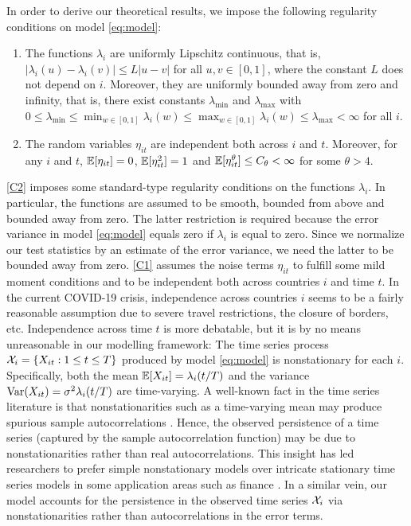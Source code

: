 \documentclass[a4paper,12pt]{article}
\numberwithin{equation}{section}
\begin{document}
In order to derive our theoretical results, we impose the following regularity conditions on model \eqref{eq:model}:
\begin{enumerate}[label=(C\arabic*),leftmargin=1.0cm]
\item \label{C2} The functions $\lambda_i$ are uniformly Lipschitz continuous, that is, $|\lambda_i(u) - \lambda_i(v)| \le L |u-v|$ for all $u, v \in [0,1]$, where the constant $L$ does not depend on $i$. Moreover, they are uniformly bounded away from zero and infinity, that is, there exist constants $\lambda_{\min}$ and $\lambda_{\max}$ with $0 \le \lambda_{\min} \le \min_{w \in [0,1]} \lambda_i(w) \le \max_{w \in [0,1]} \lambda_i(w) \le \lambda_{\max} < \infty$ for all $i$. 
\item \label{C1} The random variables $\eta_{it}$ are independent both across $i$ and $t$. Moreover, for any $i$ and $t$, $\mathbb{E}[\eta_{it}] = 0$, $\mathbb{E}[\eta_{it}^2] = 1$ and $\mathbb{E}[\eta_{it}^\theta] \le C_\theta < \infty$ for some $\theta > 4$. 
\end{enumerate}
\ref{C2} imposes some standard-type regularity conditions on the functions $\lambda_i$. In particular, the functions are assumed to be smooth, bounded from above and bounded away from zero. The latter restriction is required because the error variance in model \eqref{eq:model} equals zero if $\lambda_i$ is equal to zero. Since we normalize our test statistics by an estimate of the error variance, we need the latter to be bounded away from zero. 
\ref{C1} assumes the noise terms $\eta_{it}$ to fulfill some mild moment conditions and to be independent both across countries $i$ and time $t$. In the current COVID-19 crisis, independence across countries $i$ seems to be a fairly reasonable assumption due to severe travel restrictions, the closure of borders, etc. Independence across time $t$ is more debatable, but it is by no means unreasonable in our modelling framework: The time series process $\mathcal{X}_i = \{X_{it}: 1 \le t \le T\}$ produced by model \eqref{eq:model} is nonstationary for each $i$. Specifically, both the mean $\mathbb{E}[X_{it}] = \lambda_i(t/T)$ and the variance $\textnormal{Var}(X_{it}) = \sigma^2 \lambda_i(t/T)$ are time-varying. A well-known fact in the time series literature is that nonstationarities such as a time-varying mean may produce spurious sample autocorrelations \citep[cp.\ for example][]{MikoschStarica2004, Fryzlewicz2008}. Hence, the observed persistence of a time series (captured by the sample autocorrelation function) may be due to nonstationarities rather than real autocorrelations. This insight has led researchers to prefer simple nonstationary models over intricate stationary time series models in some application areas such as finance \citep[cp.][]{MikoschStarica2000, MikoschStarica2004, Fryzlewicz2006}. In a similar vein, our model accounts for the persistence in the observed time series $\mathcal{X}_i$ via nonstationarities rather than autocorrelations in the error terms. 
\end{document}
